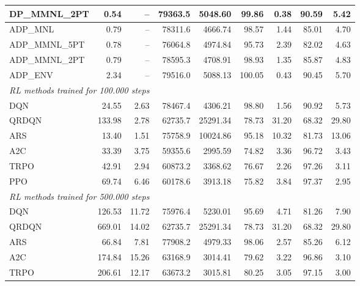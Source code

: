 \begin{samepage}
\begin{center}
\begin{tabular}{l|rr|rr|rr|rr}
    DP\_MMNL\_2PT &     0.54 &    -- &    79363.5 &    5048.60 &   99.86 &    0.38 &   90.59 &    5.42 \\
    \midrule
    ADP\_MNL     &     0.79 &    -- &    78311.6 &    4666.74 &   98.57 &    1.44 &   85.01 &    4.70 \\
    ADP\_MMNL\_5PT &     0.78 &    -- &    76064.8 &    4974.84 &   95.73 &    2.39 &   82.02 &    4.63 \\
    ADP\_MMNL\_2PT &     0.79 &    -- &    78595.3 &    4708.91 &   98.93 &    1.35 &   85.87 &    4.83 \\
    ADP\_ENV     &     2.34 &    -- &    79516.0 &    5088.13 &  100.05 &    0.43 &   90.45 &    5.70 \\
    \midrule
    \multicolumn{9}{l}{\textit{RL methods trained for 100.000 steps}} \\
    \midrule
    DQN          &    24.55 &     2.63 &    78467.4 &    4306.21 &   98.80 &    1.56 &   90.92 &    5.73 \\
    QRDQN        &   133.98 &     2.78 &    62735.7 &   25291.34 &   78.73 &   31.20 &   68.32 &   29.80 \\
    ARS          &    13.40 &     1.51 &    75758.9 &   10024.86 &   95.18 &   10.32 &   81.73 &   13.06 \\
    A2C          &    33.39 &     3.75 &    59355.6 &    2995.59 &   74.82 &    3.36 &   96.72 &    3.43 \\
    TRPO         &    42.91 &     2.94 &    60873.2 &    3368.62 &   76.67 &    2.26 &   97.26 &    3.11 \\
    PPO          &    69.74 &     6.46 &    60178.6 &    3913.18 &   75.82 &    3.84 &   97.37 &    2.95 \\
    \midrule
    \multicolumn{9}{l}{\textit{RL methods trained for 500.000 steps}} \\
    \midrule
    DQN          &   126.53 &    11.72 &    75976.4 &    5230.01 &   95.69 &    4.71 &   81.26 &    7.90 \\
    QRDQN        &   669.01 &    14.02 &    62735.7 &   25291.34 &   78.73 &   31.20 &   68.32 &   29.80 \\
    ARS          &    66.84 &     7.81 &    77908.2 &    4979.33 &   98.06 &    2.57 &   85.26 &    6.12 \\
    A2C          &   174.84 &    15.26 &    63168.9 &    3014.41 &   79.62 &    3.22 &   96.86 &    3.10 \\
    TRPO         &   206.61 &    12.17 &    63673.2 &    3015.81 &   80.25 &    3.05 &   97.15 &    3.00 \\

\end{tabular}
\end{center}
\end{samepage}

